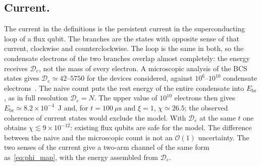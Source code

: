 \documentclass[11pt,a4paper]{article}
\begin{document}
\subsection{Current.}
\label{sec:many_body}
The current in the definitions is the persistent current in the superconducting loop of a flux qubit. The branches are the states with opposite sense of that current, clockwise and counterclockwise. The loop is the same in both, so the condensate electrons of the two branches overlap almost completely: the energy receives $\mathcal D_e$, not the mass of every electron. A microscopic analysis of the BCS states gives $\mathcal D_e\simeq42$--$5750$ for the devices considered, against $10^6$--$10^{10}$ condensate electrons~\cite{korsbakken2009,korsbakken2010}. The naive count puts the rest energy of the entire condensate into $E_{\mathrm{br}}$, as in full resolution $\mathcal D_e=N$. The upper value of $10^{10}$ electrons then gives $E_{\mathrm{br}}\simeq8.2\times10^{-4}$~J and, for $t=100~\mu\mathrm{s}$ and $\xi=1$, $\chi\simeq26.5$; the observed coherence of current states would exclude the model. With $\mathcal D_e$ at the same $t$ one obtains $\chi\lesssim9\times10^{-12}$: existing flux qubits are safe for the model. The difference between the naive and the microscopic count is not an $\mathcal O(1)$ uncertainty. The two senses of the current give a two-arm channel of the same form as~\eqref{eq:phi_map}, with the energy assembled from $\mathcal D_e$.
\end{document}
